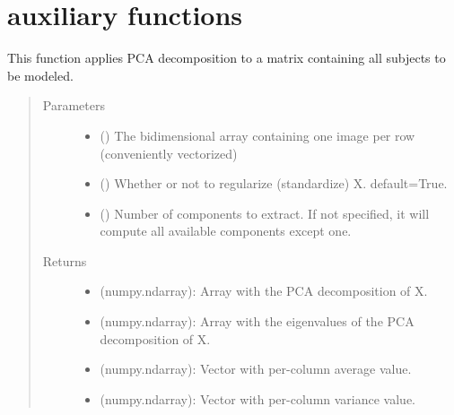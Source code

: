 \documentclass[letterpaper,10pt,english]{sphinxmanual}
\begin{document}
\section{auxiliary functions}
\label{\detokenize{api:auxiliary-functions}}

\begin{fulllineitems}
\label{\detokenize{api:brainSimulator.applyPCA}}
This function applies PCA decomposition to a matrix containing all subjects to be modeled.
\begin{quote}\begin{description}
\item[{Parameters}] \leavevmode\begin{itemize}
\item {} 
 () \textendash{} The bidimensional array containing one image per row (conveniently vectorized)

\item {} 
 () \textendash{} Whether or not to regularize (standardize) X. default=True.

\item {} 
 () \textendash{} Number of components to extract. If not specified, it will compute all available components except one.

\end{itemize}

\item[{Returns}] \leavevmode
\begin{itemize}
\item {} 
 (numpy.ndarray): Array with the PCA decomposition of X.

\item {} 
 (numpy.ndarray): Array with the eigenvalues of the PCA         decomposition of X.

\item {} 
 (numpy.ndarray): Vector with per-column average value.

\item {} 
 (numpy.ndarray): Vector with per-column variance value.

\end{itemize}


\end{description}\end{quote}

\end{fulllineitems}
\end{document}
